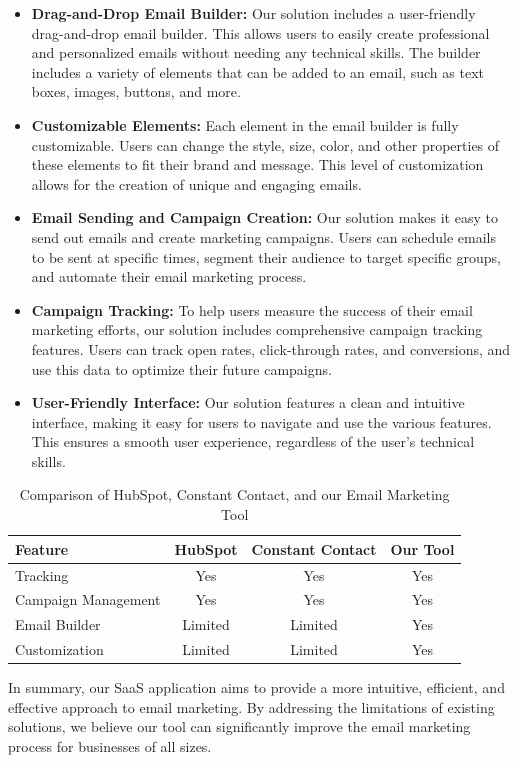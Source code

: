 \begin{itemize}
\item \textbf{Drag-and-Drop Email Builder:} Our solution includes a user-friendly drag-and-drop email builder. This allows users to easily create professional and personalized emails without needing any technical skills. The builder includes a variety of elements that can be added to an email, such as text boxes, images, buttons, and more.

\item \textbf{Customizable Elements:} Each element in the email builder is fully customizable. Users can change the style, size, color, and other properties of these elements to fit their brand and message. This level of customization allows for the creation of unique and engaging emails.

\item \textbf{Email Sending and Campaign Creation:} Our solution makes it easy to send out emails and create marketing campaigns. Users can schedule emails to be sent at specific times, segment their audience to target specific groups, and automate their email marketing process.

\item \textbf{Campaign Tracking:} To help users measure the success of their email marketing efforts, our solution includes comprehensive campaign tracking features. Users can track open rates, click-through rates, and conversions, and use this data to optimize their future campaigns.

\item \textbf{User-Friendly Interface:} Our solution features a clean and intuitive interface, making it easy for users to navigate and use the various features. This ensures a smooth user experience, regardless of the user's technical skills.

\end{itemize}

\vspace{10pt}

\begin{table}[ht]
\centering
\begin{tabularx}{\textwidth}{|X|c|c|c|}
\hline
\textbf{Feature} & \textbf{HubSpot} & \textbf{Constant Contact} & \textbf{Our Tool} \\
\hline
Tracking & Yes & Yes & Yes \\
\hline
Campaign Management & Yes & Yes & Yes \\
\hline
Email Builder & Limited & Limited & Yes \\
\hline
Customization & Limited & Limited & Yes \\
\hline
\end{tabularx}
\caption{Comparison of HubSpot, Constant Contact, and our Email Marketing Tool}
\label{tab:comparison table}
\end{table}

\vspace{10pt}

In summary, our SaaS application aims to provide a more intuitive, efficient, and effective approach to email marketing. By addressing the limitations of existing solutions, we believe our tool can significantly improve the email marketing process for businesses of all sizes.


